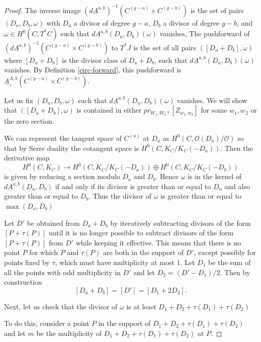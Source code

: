 \documentclass[12pt]{amsart}
\theoremstyle{definition}
\theoremstyle{remark}
\begin{document}
\begin{proof} The inverse image $\left( d\underline{A}^{a,b}\right)^{-1}  (C^{(g-a)} \times C^{(g-b)} )$ is the set of pairs $(D_a, D_b, \omega)$ with $D_a$ a divisor of degree $g-a$, $D_b$ a divisor of degree $g-b$, and $\omega\in H^0(C, T^*C)$ such that $d\underline{A}^{a,b} (D_a,D_b) (\omega)$ vanishes, The pushforward of $\left( d\underline{A}^{a,b}\right)^{-1}   (C^{(g-a)} \times C^{(g-b)} )$ to $T^* J$ is the set of all pairs $( [D_a + D_b], \omega)$ where $[D_a + D_b]$ is the divisor class of $D_a+D_b$, such that $d\underline{A}^{a,b} (D_a,D_b) (\omega)$ vanishes. By Definition \ref{circ-forward}, this pushforward is $ \underline{A}^{A,b}_{\circ} (C^{(g-a)} \times C^{(g-b)} ) $.

Let us fix $(D_a,D_b,\omega)$ such that $d\underline{A}^{a,b} (D_a,D_b) (\omega)$ vanishes. We will show that $( [D_a + D_b], \omega)$ is contained in either $pr_{W_1,W_2 *} [ Z_{w_1,w_2} ]$ for some $w_1,w_2$ or the zero section.


We can represent the tangent space of  $C^{(a)}$ at $D_a$ as $H^0(C, \mathcal O(D_a) /\mathcal O)$ so that by Serre duality the cotangent space is $H^0(C, K_C / K_C(-D_a) )$. Then the derivative map \[ H^0(C, K_C) \to H^0(C, K_C / K_C (-D_a) ) \oplus H^0(C, K_C / K_C (-D_b) )\] is given by reducing a section modulo $D_a$ and $D_b$. Hence $\omega$ is in the kernel of $d\underline{A}^{a,b} (D_a,D_b) $ if and only if its divisor is greater than or equal to $D_a$ and also greater than or equal to $D_b$. Thus the divisor of $\omega$ is greater than or equal to $\max(D_a,D_b) $

Let $D' $ be obtained from $D_a+D_b$ by iteratively subtracting divisors of the form $[P + \tau (P)]$ until it is no longer possible to subtract divisors of the form $[P + \tau(P)]$ from $D'$ while keeping it effective. This means that there is no point $P$ for which $P$ and $\tau(P)$ are both in the support of $D'$, except possibly for points fixed by $\tau$, which must have multiplicity at most $1$. Let $D_1$ be the sum of all the points with odd multiplicity in $D'$ and let $D_2 = (D' -D_1)/2$.  Then by construction \[  [D_a + D_b] = [D' ] = [D_1 + 2D_2].\] 

Next, let us check that the divisor of $\omega$ is at least $D_1+ D_2 + \tau(D_1) + \tau(D_2) $

To do this, consider a point $P$ in the support of $D_1+ D_2 + \tau(D_1) + \tau(D_2) $ and let $m$ be the multiplicity of $D_1+ D_2 + \tau(D_1) + \tau(D_2) $ at $P$.


\end{proof}
\end{document}

